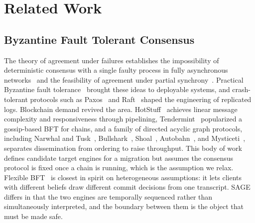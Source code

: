 \documentclass[journal]{IEEEtran}
\begin{document}
\section{Related Work}
\label{sec:related}

\subsection{Byzantine Fault Tolerant Consensus}
The theory of agreement under failures establishes the impossibility of deterministic
consensus with a single faulty process in fully asynchronous networks~\cite{flp} and the
feasibility of agreement under partial synchrony~\cite{dls}. Practical Byzantine fault
tolerance~\cite{pbft} brought these ideas to deployable systems, and crash-tolerant
protocols such as Paxos~\cite{paxos} and Raft~\cite{raft} shaped the engineering of
replicated logs. Blockchain demand revived the area. HotStuff~\cite{hotstuff} achieves
linear message complexity and responsiveness through pipelining, Tendermint~\cite{tendermint}
popularized a gossip-based BFT for chains, and a family of directed acyclic graph protocols,
including Narwhal and Tusk~\cite{narwhal}, Bullshark~\cite{bullshark}, Shoal~\cite{shoal},
Autobahn~\cite{autobahn}, and Mysticeti~\cite{mysticeti}, separates dissemination from
ordering to raise throughput. This body of work defines candidate target engines for a
migration but assumes the consensus protocol is fixed once a chain is running, which is the
assumption we relax. Flexible BFT~\cite{flexbft} is closest in spirit on heterogeneous
assumptions: it lets clients with different beliefs draw different commit decisions from one
transcript. SAGE differs in that the two engines are temporally sequenced rather than
simultaneously interpreted, and the boundary between them is the object that must be made
safe.
\end{document}
